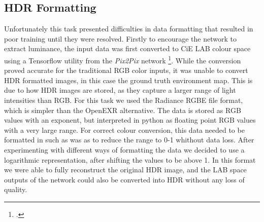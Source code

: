 \documentclass[ %
                    author={Gavin Parker},
                supervisor={Dr. Neill Campbell},
                    degree={MEng},
                     title={Deep Siamese Networks for Illumination Estimation from Stereo Images},
                  subtitle={},
                      type={research},
                      year={2018} ]{dissertation}
\begin{document}
\subsection{HDR Formatting}
Unfortunately this task presented difficulties in data formatting that resulted in poor training until they were resolved. Firstly to encourage the network to extract luminance, the input data was first converted to CiE LAB colour space using a Tensorflow utility from the \textit{Pix2Pix} network \footcite{https://github.com/affinelayer/pix2pix-tensorflow/blob/master/pix2pix.py}. While the conversion proved accurate for the traditional RGB color inputs, it was unable to convert HDR formatted images, in this case the ground truth environment map. This is due to how HDR images are stored, as they capture a larger range of light intensities than RGB. For this task we used the Radiance RGBE file format, which is simpler than the OpenEXR alternative. The data is stored as RGB values with an exponent, but interpreted in python as floating point RGB values with a very large range. For correct colour conversion, this data needed to be formatted in such as was as to reduce the range to 0-1 whithout data loss. After experimenting with different ways of formatting the data we decided to use a logarithmic representation, after shifting the values to be above 1. In this format we were able to fully reconstruct the original HDR image, and the LAB space outputs of the network could also be converted into HDR without any loss of quality.
\end{document}
